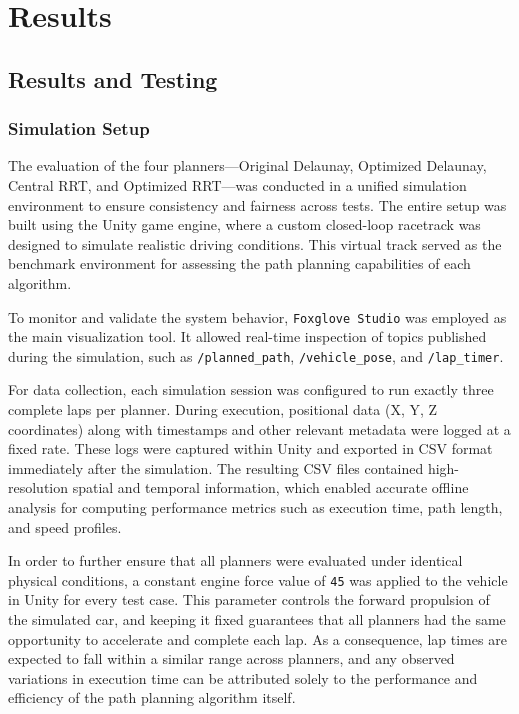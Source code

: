 \documentclass[a4paper,11pt]{report}
\begin{document}
\newpage

\chapter{Results}
\section{Results and Testing}
\subsection{Simulation Setup}

The evaluation of the four planners—Original Delaunay, Optimized Delaunay, Central RRT, and Optimized RRT—was conducted in a unified simulation environment to ensure consistency and fairness across tests. The entire setup was built using the Unity game engine, where a custom closed-loop racetrack was designed to simulate realistic driving conditions. This virtual track served as the benchmark environment for assessing the path planning capabilities of each algorithm.

To monitor and validate the system behavior, \texttt{Foxglove Studio} was employed as the main visualization tool. It allowed real-time inspection of topics published during the simulation, such as \texttt{/planned\_path}, \texttt{/vehicle\_pose}, and \texttt{/lap\_timer}.

For data collection, each simulation session was configured to run exactly three complete laps per planner. During execution, positional data (X, Y, Z coordinates) along with timestamps and other relevant metadata were logged at a fixed rate. These logs were captured within Unity and exported in CSV format immediately after the simulation. The resulting CSV files contained high-resolution spatial and temporal information, which enabled accurate offline analysis for computing performance metrics such as execution time, path length, and speed profiles.

In order to further ensure that all planners were evaluated under identical physical conditions, a constant engine force value of \texttt{45} was applied to the vehicle in Unity for every test case. This parameter controls the forward propulsion of the simulated car, and keeping it fixed guarantees that all planners had the same opportunity to accelerate and complete each lap. As a consequence, lap times are expected to fall within a similar range across planners, and any observed variations in execution time can be attributed solely to the performance and efficiency of the path planning algorithm itself.
\end{document}
